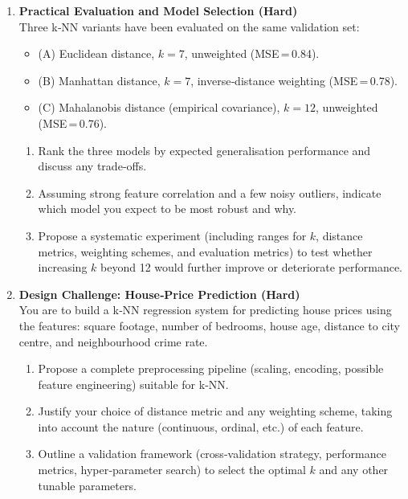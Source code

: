 \documentclass[12pt, a4paper]{article}
\begin{document}
\begin{enumerate}
  \item \textbf{Practical Evaluation and Model Selection (Hard)}\\
    Three k‑NN variants have been evaluated on the same validation set:
    \begin{itemize}
      \item (A) Euclidean distance, \(k=7\), unweighted (MSE = 0.84).
      \item (B) Manhattan distance, \(k=7\), inverse‑distance weighting (MSE = 0.78).
      \item (C) Mahalanobis distance (empirical covariance), \(k=12\), unweighted (MSE = 0.76).
    \end{itemize}
    \begin{enumerate}[label=\alph)]
      \item Rank the three models by expected generalisation performance and discuss any trade‑offs.
      \item Assuming strong feature correlation and a few noisy outliers, indicate which model you expect to be most robust and why.
      \item Propose a systematic experiment (including ranges for \(k\), distance metrics, weighting schemes, and evaluation metrics) to test whether increasing \(k\) beyond 12 would further improve or deteriorate performance.
    \end{enumerate}

  \item \textbf{Design Challenge: House‑Price Prediction (Hard)}\\
    You are to build a k‑NN regression system for predicting house prices using the features: square footage, number of bedrooms, house age, distance to city centre, and neighbourhood crime rate.
    \begin{enumerate}[label=\alph*)]
      \item Propose a complete preprocessing pipeline (scaling, encoding, possible feature engineering) suitable for k‑NN.
      \item Justify your choice of distance metric and any weighting scheme, taking into account the nature (continuous, ordinal, etc.) of each feature.
      \item Outline a validation framework (cross‑validation strategy, performance metrics, hyper‑parameter search) to select the optimal \(k\) and any other tunable parameters.
    \end{enumerate}
\end{enumerate}
\end{document}
